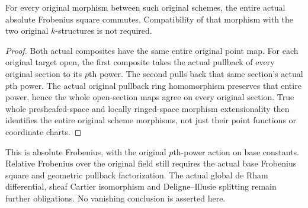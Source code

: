 \begin{theorem}
\label{thm:cartier-original-entire-scheme-frobenius-naturality}
\leanok
For every original morphism between such original schemes, the entire
actual absolute Frobenius square commutes. Compatibility of that
morphism with the two original $k$-structures is not required.
\end{theorem}
\begin{proof}
Both actual composites have the same entire original point map.
For each original target open, the first composite takes the actual
pullback of every original section to its $p$th power. The second
pulls back that same section's actual $p$th power. The actual original
pullback ring homomorphism preserves that entire power, hence the
whole open-section maps agree on every original section. True whole
presheafed-space and locally ringed-space morphism extensionality
then identifies the entire original scheme morphisms, not just
their point functions or coordinate charts.
\end{proof}

This is absolute Frobenius, with the original $p$th-power action on
base constants. Relative Frobenius over the original field still
requires the actual base Frobenius square and geometric pullback
factorization. The actual global de Rham differential, sheaf
Cartier isomorphism and Deligne--Illusie splitting remain further
obligations. No vanishing conclusion is asserted here.
